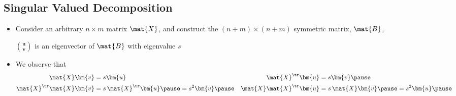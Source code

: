 \begin{slide}
\section[-2]{Singular Valued Decomposition}

\pb
\begin{itemize}\squeeze
\item Consider an arbitrary $n\times m$ matrix $\mat{X}$, and construct
  the $(n+m)\times(n+m)$ symmetric matrix, $\mat{B}$, \pauseh{}
  \vspace*{-1cm}
  \begin{center}
    \pause
  \end{center}
  \vspace*{-1cm}
  $\binom{\bm{u}}{\bm{v}}$ is an eigenvector of $\mat{B}$ with eigenvalue $s$\pause
\item We observe that
  \begin{align*}
    \mat{X} \bm{v} &= s \bm{u} &
    \mat{X}^\tr \bm{u} &= s \bm{v} \pause\\
    \mat{X}^\tr \mat{X} \bm{v} &= s\,\mat{X}^\tr\bm{u} \pause = s^2 \bm{v}\pause &
    \mat{X} \mat{X}^\tr \bm{u} &= s\,\mat{X}\bm{v}\pause = s^2 \bm{u}\pause
  \end{align*}
\end{itemize}

\end{slide}


